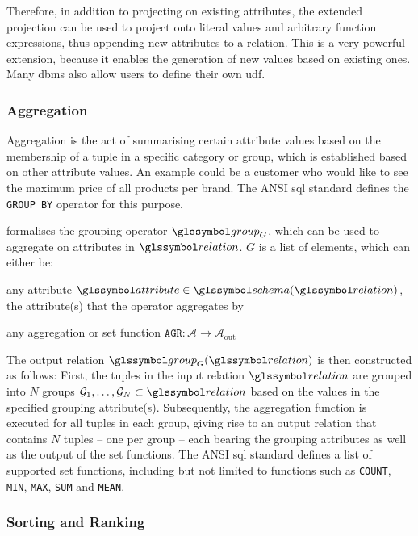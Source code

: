 Therefore, in addition to projecting on existing attributes, the extended projection can be used to project onto literal values and arbitrary function expressions, thus appending new attributes to a relation. This is a very powerful extension, because it enables the generation of new values based on existing ones. Many \acrshort{dbms} also allow users to define their own \acrfull{udf}.

\subsubsection{Aggregation}

Aggregation is the act of summarising certain attribute values based on the membership of a tuple in a specific category or group, which is established based on other attribute values. An example could be a customer who would like to see the maximum price of all products per brand. The ANSI \acrshort{sql} standard \cite{XOpen:1996SQL} defines the \texttt{GROUP BY} operator for this purpose.

\cite{Garcia:2009Database} formalises the grouping operator $\group_{G}$, which can be used to aggregate on attributes in $\relation$. $G$ is a list of elements, which can either be:
\begin{enumerate*}[label=(\roman*),itemjoin={{, }}, itemjoin*={{, or, }}, after={{.}}]
    \item any attribute $\attribute \in \schema(\relation)$, the attribute(s) that the operator aggregates by
    \item any aggregation or set function $\texttt{AGR} \colon \mathcal{A} \rightarrow \mathcal{A}_{\text{out}}$
\end{enumerate*}

The output relation $\group_G (\relation)$ is then constructed as follows: First, the tuples in the input relation  $\relation$ are grouped into $N$ groups $\mathcal{G}_1, \ldots,\mathcal{G}_N \subset \relation$ based on the values in the specified grouping attribute(s). Subsequently, the aggregation function is executed for all tuples in each group, giving rise to an output relation that contains $N$ tuples --  one per group -- each bearing the grouping attributes as well as the output of the set functions. The ANSI \acrshort{sql} standard \cite{XOpen:1996SQL} defines a list of supported set functions, including but not limited to functions such as \texttt{COUNT}, \texttt{MIN}, \texttt{MAX}, \texttt{SUM} and \texttt{MEAN}.

\subsubsection{Sorting and Ranking}

